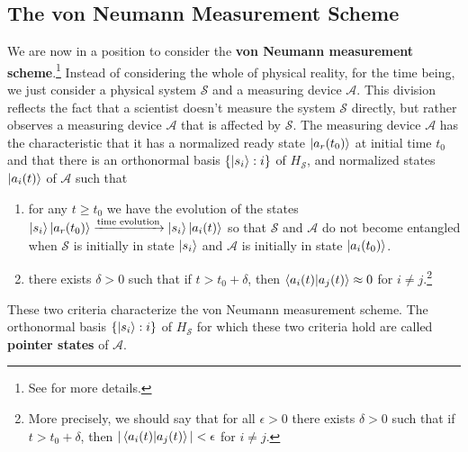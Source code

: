     
    \subsection{The von Neumann Measurement Scheme}\label{vonNeumannMeasurement}
    \addtocounter{footnote}{-1}
    \addtocounter{footnote}{1}
    
    We are now in a position to consider the \textbf{von Neumann measurement scheme}.\footnote{See \cite[50-53]{Schlosshauer} for more details.} Instead of considering the whole of physical reality, for the time being, we just consider a physical system $\mathcal{S}$ and a measuring device $\mathcal{A}$.  %
%
    This division reflects the fact that a scientist doesn't measure the system $\mathcal{S}$ directly, but rather observes a measuring device $\mathcal{A}$ that is affected by $\mathcal{S}$. The measuring device $\mathcal{A}$ has the characteristic that it has a normalized ready state $\ket{a_r(t_0)}$   %
%
    at initial time $t_0$ and that there is an orthonormal basis $\{\ket{s_i}:i\}$ of $H_\mathcal{S}$, and normalized states $\ket{a_i(t)}$ of $\mathcal{A}$ such that
    \begin{enumerate}[noitemsep, nosep, topsep=0pt] 
    \item for any $t\geq t_0$ we have the evolution of the states \label{vonNeumannMeasurement1}
    $\ket{s_i}\ket{a_r(t_0)}\xrightarrow{\text{time evolution}}\ket{s_i}\ket{a_i(t)}$ so that $\mathcal{S}$ and $\mathcal{A}$ do not become entangled when $\mathcal{S}$ is initially in state $\ket{s_i}$ and $\mathcal{A}$ is initially in state $\ket{a_i(t_0)}$.
    \item \label{vonNeumannMeasurement2} there exists $\delta>0$ such that if $t> t_0+\delta$, then $\ip{a_i(t)}{a_j(t)}\approx 0$ %
     for $i\neq j$.\footnote{\label{approx}More precisely, we should say that for all $\epsilon >0$ there exists $\delta>0$ such that if $t> t_0+\delta$, then $|\ip{a_i(t)}{a_j(t)}|<\epsilon$ for $i\neq j$.}
    \end{enumerate}
    These two criteria    %
%
    characterize the von Neumann measurement scheme. The orthonormal basis $\{\ket{s_i}:i\}$ of $H_\mathcal{S}$ for which these two criteria hold are called \textbf{pointer states\label{pointer}} of $\mathcal{A}$.   %
